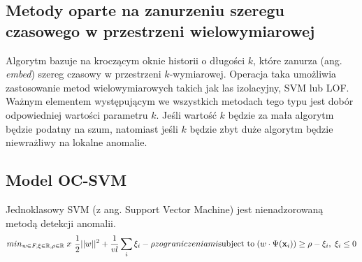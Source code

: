 \subsection{Metody oparte na zanurzeniu szeregu czasowego w przestrzeni wielowymiarowej}

Algorytm bazuje na kroczącym oknie historii o długości $k$, które zanurza (ang. \emph{embed}) szereg czasowy w przestrzeni $k$-wymiarowej. Operacja taka umożliwia zastosowanie metod wielowymiarowych takich jak las izolacyjny, SVM lub LOF. Ważnym elementem występującym we wszystkich metodach tego typu jest dobór odpowiedniej wartości parametru $k$. Jeśli wartość $k$ będzie za mała algorytm będzie podatny na szum, natomiast jeśli $k$ będzie zbyt duże algorytm będzie niewrażliwy na lokalne anomalie. 


\subsection{Model OC-SVM}
\label{subsection:svm}

Jednoklasowy SVM (z ang. Support Vector Machine) jest nienadzorowaną metodą detekcji anomalii. 
\begin{equation}
    min_{w \in F, \bf{\xi} \in \mathbb{R}, \rho \in \mathbb{R}}\; x\ \frac{1}{2}||w||^{2} + \frac{1}{vl}\sum_{i} \xi_{i} - \rho 
    z ograniczeniami \text{subject to}\; (w\cdot\Psi(\textbf{x}_{i})) \geq \rho - \xi_{i}, \; \xi_{i} \leq 0
\end{equation}

